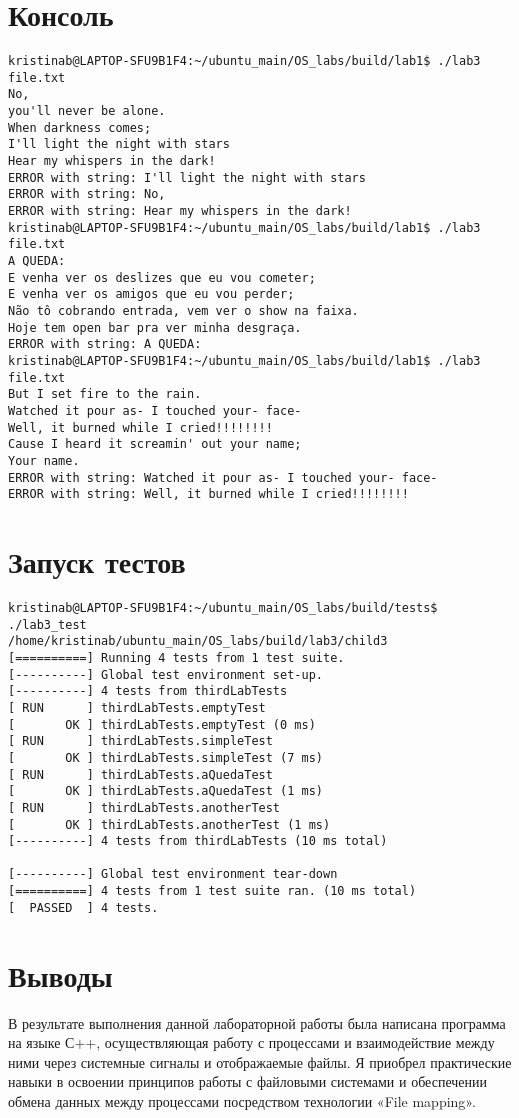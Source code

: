 \documentclass[a4paper, 12pt]{article}
\begin{document}
\section{Консоль}
\begin{verbatim}
kristinab@LAPTOP-SFU9B1F4:~/ubuntu_main/OS_labs/build/lab1$ ./lab3 file.txt
No,
you'll never be alone.
When darkness comes;
I'll light the night with stars
Hear my whispers in the dark!
ERROR with string: I'll light the night with stars
ERROR with string: No,
ERROR with string: Hear my whispers in the dark!
kristinab@LAPTOP-SFU9B1F4:~/ubuntu_main/OS_labs/build/lab1$ ./lab3 file.txt
A QUEDA:
E venha ver os deslizes que eu vou cometer;
E venha ver os amigos que eu vou perder;
Não tô cobrando entrada, vem ver o show na faixa.
Hoje tem open bar pra ver minha desgraça.
ERROR with string: A QUEDA:
kristinab@LAPTOP-SFU9B1F4:~/ubuntu_main/OS_labs/build/lab1$ ./lab3 file.txt
But I set fire to the rain.
Watched it pour as- I touched your- face-
Well, it burned while I cried!!!!!!!!
Cause I heard it screamin' out your name;
Your name.
ERROR with string: Watched it pour as- I touched your- face-
ERROR with string: Well, it burned while I cried!!!!!!!!
\end{verbatim}

\section{Запуск тестов}
\begin{verbatim}
kristinab@LAPTOP-SFU9B1F4:~/ubuntu_main/OS_labs/build/tests$ ./lab3_test
/home/kristinab/ubuntu_main/OS_labs/build/lab3/child3
[==========] Running 4 tests from 1 test suite.
[----------] Global test environment set-up.
[----------] 4 tests from thirdLabTests
[ RUN      ] thirdLabTests.emptyTest
[       OK ] thirdLabTests.emptyTest (0 ms)
[ RUN      ] thirdLabTests.simpleTest
[       OK ] thirdLabTests.simpleTest (7 ms)
[ RUN      ] thirdLabTests.aQuedaTest
[       OK ] thirdLabTests.aQuedaTest (1 ms)
[ RUN      ] thirdLabTests.anotherTest
[       OK ] thirdLabTests.anotherTest (1 ms)
[----------] 4 tests from thirdLabTests (10 ms total)

[----------] Global test environment tear-down
[==========] 4 tests from 1 test suite ran. (10 ms total)
[  PASSED  ] 4 tests.
\end{verbatim}
\newpage

\section{Выводы}

В результате выполнения данной лабораторной работы была написана программа на языке С++, осуществляющая работу с процессами и взаимодействие между ними через системные сигналы и отображаемые файлы. Я приобрел практические навыки в освоении принципов работы с файловыми системами и обеспечении обмена данных между процессами посредством технологии «File mapping».
\end{document}
